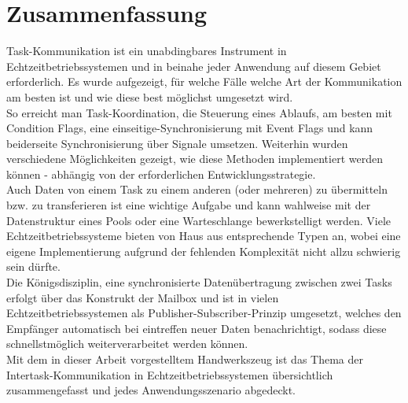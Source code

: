 \documentclass{llncs}
\begin{document}
\section{Zusammenfassung}
Task-Kommunikation ist ein unabdingbares Instrument in Echtzeitbetriebssystemen und in beinahe jeder Anwendung auf diesem Gebiet erforderlich. Es wurde aufgezeigt, für welche Fälle welche Art der Kommunikation am besten ist und wie diese best möglichst umgesetzt wird.\\

So erreicht man Task-Koordination, die Steuerung eines Ablaufs, am besten mit Condition Flags, eine einseitige-Synchronisierung mit Event Flags und kann beiderseite Synchronisierung über Signale umsetzen. Weiterhin wurden verschiedene Möglichkeiten gezeigt, wie diese Methoden implementiert werden können - abhängig von der erforderlichen Entwicklungsstrategie.\\

Auch Daten von einem Task zu einem anderen (oder mehreren) zu übermitteln bzw. zu transferieren ist eine wichtige Aufgabe und kann wahlweise mit der Datenstruktur eines Pools oder eine Warteschlange bewerkstelligt werden. Viele Echtzeitbetriebssysteme bieten von Haus aus entsprechende Typen an, wobei eine eigene Implementierung aufgrund der fehlenden Komplexität nicht allzu schwierig sein dürfte.\\

Die Königsdisziplin, eine synchronisierte Datenübertragung zwischen zwei Tasks erfolgt über das Konstrukt der Mailbox und ist in vielen Echtzeitbetriebssystemen als Publisher-Subscriber-Prinzip umgesetzt, welches den Empfänger automatisch bei eintreffen neuer Daten benachrichtigt, sodass diese schnellstmöglich weiterverarbeitet werden können.\\

Mit dem in dieser Arbeit vorgestelltem Handwerkszeug ist das Thema der Intertask-Kommunikation in Echtzeitbetriebssystemen übersichtlich zusammengefasst und jedes Anwendungsszenario abgedeckt.

\printbibliography
\end{document}
